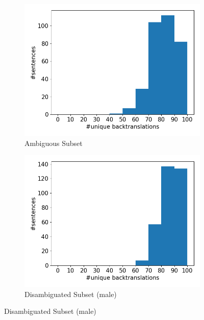 \begin{figure}[!htb]
     \centering
     
     \begin{subfigure}{0.49\textwidth}
         \centering
         \includegraphics[width=\textwidth]{figures/uniqueness/unique_sampling/unique_back_original.png}
         \caption{Ambiguous Subset}
     \end{subfigure}
     \hfill
     \begin{subfigure}{0.49\textwidth}
         \centering
         \includegraphics[width=\textwidth]{figures/uniqueness/unique_sampling/unique_back_male.png}
         \caption{Disambiguated Subset (male)}

\end{subfigure}
\end{figure}
